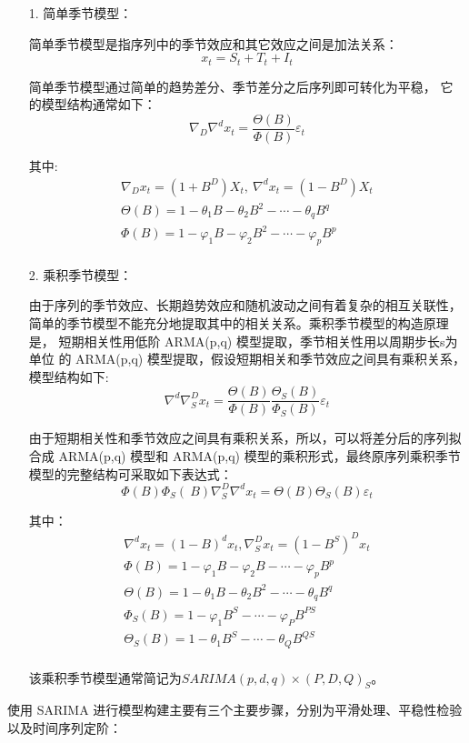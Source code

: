 \documentclass[AutoFakeBold]{LZUThesis}
\begin{document}
\begin{itemize}
\item[1. ] 简单季节模型：

简单季节模型是指序列中的季节效应和其它效应之间是加法关系：
$$x_t=S_t+T_t+I_t$$

简单季节模型通过简单的趋势差分、季节差分之后序列即可转化为平稳，
它的模型结构通常如下：
$$\nabla_D\nabla^dx_t=\frac{\Theta(B)}{\Phi(B)}\varepsilon_t$$

其中:
$$
\begin{matrix}
\nabla_Dx_t=\left(1+B^D\right)X_t,{\ }\nabla^dx_t=\left(1-B^D\right)X_t\\
\Theta(B)=1-\theta_1B-\theta_2B^2-\cdots-\theta_qB^q\\
\Phi(B)=1-\varphi_1B-\varphi_2B^2-\cdots-\varphi_pB^p\\
\end{matrix}
$$

\item[2. ] 乘积季节模型：

由于序列的季节效应、长期趋势效应和随机波动之间有着复杂的相互关联性，
简单的季节模型不能充分地提取其中的相关关系。乘积季节模型的构造原理是，
短期相关性用低阶 ARMA(p,q) 模型提取，季节相关性用以周期步长s为单位
的 ARMA(p,q) 模型提取，假设短期相关和季节效应之间具有乘积关系，
模型结构如下:
$$\nabla^d\nabla_S^Dx_t=\frac{\Theta(B)}{\Phi(B)}\frac{\Theta_S(B)}{\Phi_S(B)}\varepsilon_t$$

由于短期相关性和季节效应之间具有乘积关系，所以，可以将差分后的序列拟合成 ARMA(p,q) 模型和 ARMA(p,q) 模型的乘积形式，最终原序列乘积季节模型的完整结构可采取如下表达式：
$$\Phi(B)\Phi_S(\mathrm{\ }B)\nabla_S^D\nabla^dx_t=\Theta(B)\Theta_S(B)\varepsilon_t$$

其中：
$$
\begin{matrix}
\nabla^dx_t=(1-B)^dx_t,\nabla_S^Dx_t=\left(1-B^S\right)^Dx_t\\
\Phi(B)=1-\varphi_1B-\varphi_2B-\cdots-\varphi_pB^p\\
\Theta(B)=1-\theta_1B-\theta_2B^2-\cdots-\theta_qB^q\\
\Phi_S(B)=1-\varphi_1B^S-\cdots-\varphi_PB^{PS}\\
\Theta_S(B)=1-\theta_1B^S-\cdots-\theta_QB^{QS}\\
\end{matrix}
$$

该乘积季节模型通常简记为$SARIMA(p,d,q)\times(P,D,Q)_S$。
\end{itemize}

使用 SARIMA 进行模型构建主要有三个主要步骤，分别为平滑处理、平稳性检验
以及时间序列定阶\cite{Foneone2019时间序列}：
\end{document}
